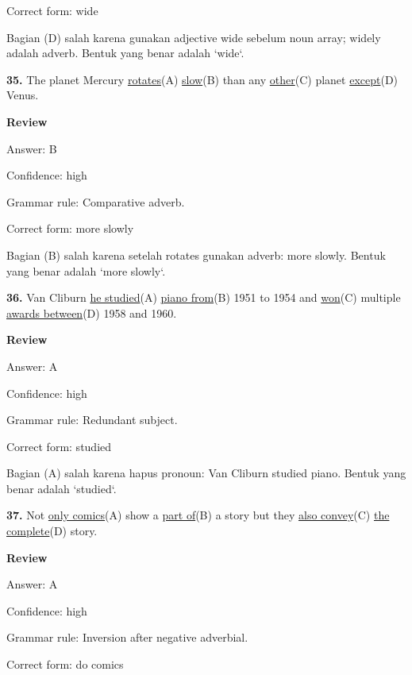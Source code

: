 \documentclass[12pt]{article}
\begin{document}
Correct form: wide\par
Bagian (D) salah karena gunakan adjective wide sebelum noun array; widely adalah adverb. Bentuk yang benar adalah `wide`.\par
\endgroup
\par
\vspace{\questionblockgap}
\noindent\textbf{35.} The planet Mercury \uline{rotates}(A) \uline{slow}(B) than any \uline{other}(C) planet \uline{except}(D) Venus.
\par
\begingroup
\setlength{\parskip}{0pt}
\setlength{\parindent}{0pt}
\textbf{Review}\par
Answer: B\par
Confidence: high\par
Grammar rule: Comparative adverb.\par
Correct form: more slowly\par
Bagian (B) salah karena setelah rotates gunakan adverb: more slowly. Bentuk yang benar adalah `more slowly`.\par
\endgroup
\par
\vspace{\questionblockgap}
\noindent\textbf{36.} Van Cliburn \uline{he studied}(A) \uline{piano from}(B) 1951 to 1954 and \uline{won}(C) multiple \uline{awards between}(D) 1958 and 1960.
\par
\begingroup
\setlength{\parskip}{0pt}
\setlength{\parindent}{0pt}
\textbf{Review}\par
Answer: A\par
Confidence: high\par
Grammar rule: Redundant subject.\par
Correct form: studied\par
Bagian (A) salah karena hapus pronoun: Van Cliburn studied piano. Bentuk yang benar adalah `studied`.\par
\endgroup
\par
\vspace{\questionblockgap}
\noindent\textbf{37.} Not \uline{only comics}(A) show a \uline{part of}(B) a story but they \uline{also convey}(C) \uline{the complete}(D) story.
\par
\begingroup
\setlength{\parskip}{0pt}
\setlength{\parindent}{0pt}
\textbf{Review}\par
Answer: A\par
Confidence: high\par
Grammar rule: Inversion after negative adverbial.\par
Correct form: do comics\par
\end{document}

